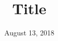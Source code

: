 \documentclass[10pt,reqno]{amsart}
\title{Title}                   %
\author{%
  Marcel K. de Carli Silva
  \texorpdfstring{\and}{and}
  co-author}
\date{August 13, 2018}
\begin{document}
\begin{abstract}

\end{abstract}

\maketitle

\tableofcontents

\nocite{Rockafellar97a}

\begingroup
\printbibliography
\endgroup
\end{document}
